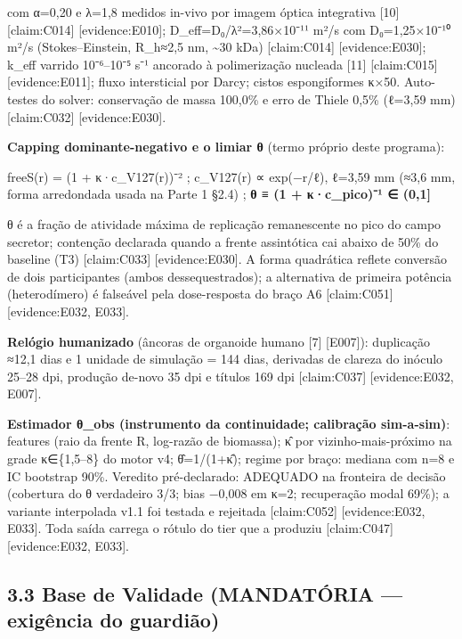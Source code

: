 \documentclass[
  12pt,
]{report}
\begin{document}
com α=0,20 e λ=1,8 medidos in-vivo por imagem óptica integrativa
{[}10{]} {[}claim:C014{]} {[}evidence:E010{]}; D\_eff=D₀/λ²=3,86×10⁻¹¹
m²/s com D₀=1,25×10⁻¹⁰ m²/s (Stokes--Einstein, R\_h≈2,5 nm,
\textasciitilde30 kDa) {[}claim:C014{]} {[}evidence:E030{]}; k\_eff
varrido 10⁻⁶--10⁻⁵ s⁻¹ ancorado à polimerização nucleada {[}11{]}
{[}claim:C015{]} {[}evidence:E011{]}; fluxo intersticial por Darcy;
cistos espongiformes κ×50. Auto-testes do solver: conservação de massa
100,0\% e erro de Thiele 0,5\% (ℓ=3,59 mm) {[}claim:C032{]}
{[}evidence:E030{]}.

\textbf{Capping dominante-negativo e o limiar θ} (termo próprio deste
programa):

freeS(r) = (1 + κ·c\_V127(r))⁻² ; c\_V127(r) ∝ exp(−r/ℓ), ℓ=3,59 mm
(≈3,6 mm, forma arredondada usada na Parte 1 §2.4) ; \textbf{θ ≡ (1 +
κ·c\_pico)⁻¹ ∈ (0,1{]}}

θ é a fração de atividade máxima de replicação remanescente no pico do
campo secretor; contenção declarada quando a frente assintótica cai
abaixo de 50\% do baseline (T3) {[}claim:C033{]} {[}evidence:E030{]}. A
forma quadrática reflete conversão de dois participantes (ambos
dessequestrados); a alternativa de primeira potência (heterodímero) é
falseável pela dose-resposta do braço A6 {[}claim:C051{]}
{[}evidence:E032, E033{]}.

\textbf{Relógio humanizado} (âncoras de organoide humano {[}7{]}
{[}E007{]}): duplicação ≈12,1 dias e 1 unidade de simulação = 144 dias,
derivadas de clareza do inóculo 25--28 dpi, produção de-novo 35 dpi e
títulos 169 dpi {[}claim:C037{]} {[}evidence:E032, E007{]}.

\textbf{Estimador θ\_obs (instrumento da continuidade; calibração
sim-a-sim)}: features (raio da frente R, log-razão de biomassa); κ̂ por
vizinho-mais-próximo na grade κ∈\{1,5--8\} do motor v4; θ̂=1/(1+κ̂);
regime por braço: mediana com n=8 e IC bootstrap 90\%. Veredito
pré-declarado: ADEQUADO na fronteira de decisão (cobertura do θ
verdadeiro 3/3; bias −0,008 em κ=2; recuperação modal 69\%); a variante
interpolada v1.1 foi testada e rejeitada {[}claim:C052{]}
{[}evidence:E032, E033{]}. Toda saída carrega o rótulo do tier que a
produziu {[}claim:C047{]} {[}evidence:E032, E033{]}.

\hypertarget{base-de-validade-mandatuxf3ria-exiguxeancia-do-guardiuxe3o}{%
\subsection{3.3 Base de Validade (MANDATÓRIA --- exigência do
guardião)}\label{base-de-validade-mandatuxf3ria-exiguxeancia-do-guardiuxe3o}}
\end{document}

